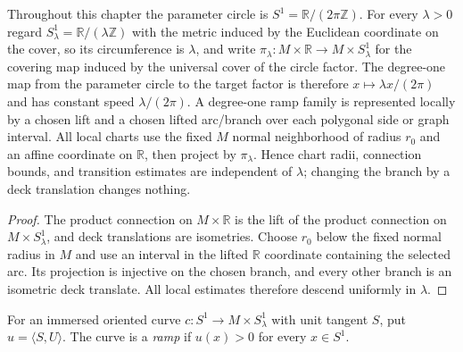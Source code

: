 \begin{definition}
\label{def:lifted-ramp-chart-branch}
\notready
Throughout this chapter the parameter circle is
$S^1=\mathbb R/(2\pi\mathbb Z)$.  For every $\lambda>0$ regard
$S^1_\lambda=\mathbb R/(\lambda\mathbb Z)$ with the metric induced by the
Euclidean coordinate on the cover, so its circumference is $\lambda$, and
write $\pi_\lambda\colon M\times\mathbb R\to M\times S^1_\lambda$ for the
covering map induced by the universal cover of the circle factor.  The
degree-one map from the parameter circle to the target factor is therefore
$x\mapsto\lambda x/(2\pi)$ and has constant speed $\lambda/(2\pi)$.  A
degree-one ramp family is represented locally by a chosen
lift and a chosen lifted arc/branch over each polygonal side or graph interval.
All local charts use the fixed $M$ normal neighborhood of radius $r_0$ and an
affine coordinate on $\mathbb R$, then project by $\pi_\lambda$.  Hence chart
radii, connection bounds, and transition estimates are independent of
$\lambda$; changing the branch by a deck translation changes nothing.
\end{definition}
\begin{proof}
The product connection on $M\times\mathbb R$ is the lift of the product
connection on $M\times S^1_\lambda$, and deck translations are isometries.
Choose $r_0$ below the fixed normal radius in $M$ and use an interval in the
lifted $\mathbb R$ coordinate containing the selected arc.  Its projection is
injective on the chosen branch, and every other branch is an isometric deck
translate.  All local estimates therefore descend uniformly in $\lambda$.
\end{proof}

\begin{definition}[Ramp]
\label{def:ramp-curve}
\notready
For an immersed oriented curve $c\colon S^1\to M\times S^1_\lambda$ with
unit tangent $S$, put $u=\langle S,U\rangle$.  The curve is a \emph{ramp} if
$u(x)>0$ for every $x\in S^1$.
\end{definition}

